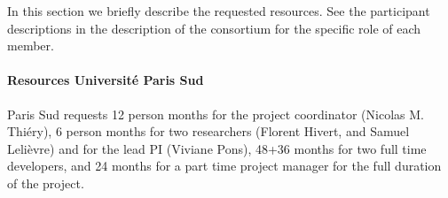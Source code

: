 %
%
%
%
%
%
%

In this section we briefly describe the requested resources. See the
participant descriptions in the description of the consortium for the
specific role of each member.


\paragraph{Resources Universit\'{e} Paris Sud}

Paris Sud requests 12 person months for the project coordinator
(Nicolas M. Thiéry), 6 person months for two researchers (Florent Hivert,
and Samuel Lelièvre) and for the lead PI (Viviane Pons), 48+36 months
for two full time developers, and 24 months for a part time project
manager for the full duration of the project.




